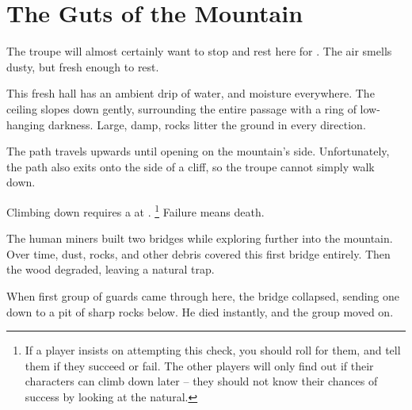 \section{The Guts of the Mountain}

\begin{multicols}{2}

\renewcommand\npcsymbol{\glsentrysymbol{yonder}}

The troupe will almost certainly want to stop and rest here for .
The air smells dusty, but fresh enough to rest.

\begin{boxtext}
  This fresh hall has an ambient drip of water, and moisture everywhere.
  The ceiling slopes down gently, surrounding the entire passage with a ring of low-hanging darkness.
  Large, damp, rocks litter the ground in every direction.
\end{boxtext}




\playCommentaryAftermath[t]


The path travels upwards until opening on the mountain's side.
Unfortunately, the path also exits onto the side of a cliff, so the troupe cannot simply walk down.

Climbing down requires a  at \tn[14].%
\footnote{If a player insists on attempting this check, you should roll for them, and tell them if they succeed or fail.  The other players will only find out if their characters can climb down later -- they should not know their chances of success by looking at the \gls{natural}.}
Failure means death.


\begin{exampletext}
  The human miners built two bridges while exploring further into the mountain.
  Over time, dust, rocks, and other debris covered this first bridge entirely.
  Then the wood degraded, leaving a natural trap.

  When first group of \glspl{guard} came through here, the bridge collapsed, sending one down to a pit of sharp rocks below.
  He died instantly, and the group moved on.
\end{exampletext}


\end{multicols}
